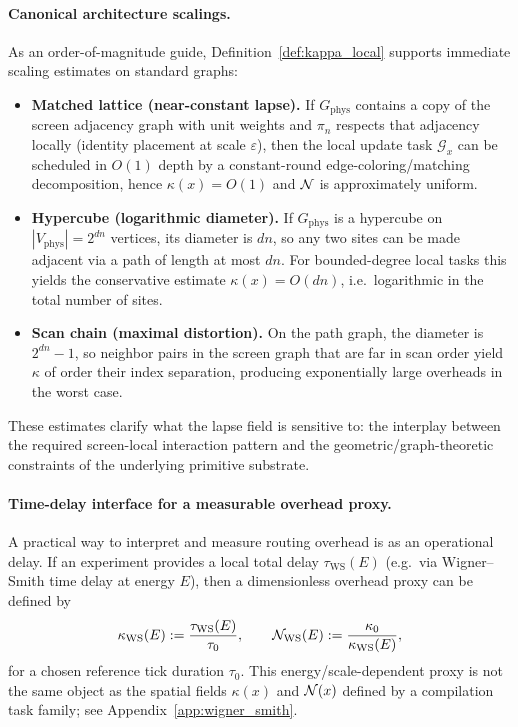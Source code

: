 \paragraph{Canonical architecture scalings.}
As an order-of-magnitude guide, Definition~\ref{def:kappa_local} supports immediate scaling estimates on standard graphs:
\begin{itemize}
\item \textbf{Matched lattice (near-constant lapse).}
If $G_{\mathrm{phys}}$ contains a copy of the screen adjacency graph with unit weights and $\pi_n$ respects that adjacency locally (identity placement at scale $\varepsilon$), then the local update task $\mathcal{G}_x$ can be scheduled in $O(1)$ depth by a constant-round edge-coloring/matching decomposition, hence $\kappa(x)=O(1)$ and $\mathcal{N}$ is approximately uniform.
\item \textbf{Hypercube (logarithmic diameter).}
If $G_{\mathrm{phys}}$ is a hypercube on $|V_{\mathrm{phys}}|=2^{dn}$ vertices, its diameter is $dn$, so any two sites can be made adjacent via a path of length at most $dn$.
For bounded-degree local tasks this yields the conservative estimate $\kappa(x)=O(dn)$, i.e.\ logarithmic in the total number of sites.
\item \textbf{Scan chain (maximal distortion).}
On the path graph, the diameter is $2^{dn}-1$, so neighbor pairs in the screen graph that are far in scan order yield $\kappa$ of order their index separation, producing exponentially large overheads in the worst case.
\end{itemize}
These estimates clarify what the lapse field is sensitive to: the interplay between the required screen-local interaction pattern and the geometric/graph-theoretic constraints of the underlying primitive substrate.

\paragraph{Time-delay interface for a measurable overhead proxy.}
A practical way to interpret and measure routing overhead is as an operational delay.
If an experiment provides a local total delay $\tau_{\mathrm{WS}}(E)$ (e.g.\ via Wigner--Smith time delay at energy $E$), then a dimensionless overhead proxy can be defined by
\[
\kappa_{\mathrm{WS}}(E):=\frac{\tau_{\mathrm{WS}}(E)}{\tau_0},
\qquad
\mathcal{N}_{\mathrm{WS}}(E):=\frac{\kappa_0}{\kappa_{\mathrm{WS}}(E)},
\]
for a chosen reference tick duration $\tau_0$.
This energy/scale-dependent proxy is not the same object as the spatial fields $\kappa(x)$ and $\mathcal{N}(x)$ defined by a compilation task family; see Appendix~\ref{app:wigner_smith}.

